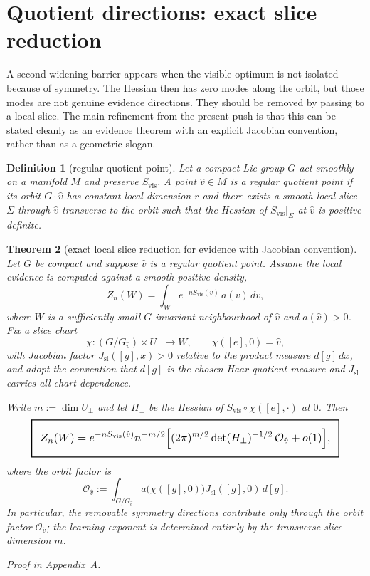 \documentclass[11pt,a4paper]{article}
\numberwithin{equation}{section}
\newcommand{\geomboxed}[1]{%
  \setlength{\fboxsep}{8pt}%
  \setlength{\fboxrule}{0.9pt}%
  \fbox{\scalebox{1.12}{$\displaystyle #1$}}%
}
\theoremstyle{thmcompact}
\newtheorem{theorem}{Theorem}[section]
\newtheorem{definition}[theorem]{Definition}
\theoremstyle{remark}
\newcommand{\proofappendix}{\par{\hfill\scriptsize\emph{Proof in Appendix~A.}}\par}
\begin{document}
\section{Quotient directions: exact slice reduction}

A second widening barrier appears when the visible optimum is not isolated because of symmetry. The Hessian then has zero modes along the orbit, but those modes are not genuine evidence directions. They should be removed by passing to a local slice. The main refinement from the present push is that this can be stated cleanly as an evidence theorem with an explicit Jacobian convention, rather than as a geometric slogan.

\begin{definition}[regular quotient point]
Let a compact Lie group $G$ act smoothly on a manifold $M$ and preserve $S_{\mathrm{vis}}$. A point $\hat v\in M$ is a \emph{regular quotient point} if its orbit $G\cdot \hat v$ has constant local dimension $r$ and there exists a smooth local slice $\Sigma$ through $\hat v$ transverse to the orbit such that the Hessian of $S_{\mathrm{vis}}|_{\Sigma}$ at $\hat v$ is positive definite.
\end{definition}

\begin{theorem}[exact local slice reduction for evidence with Jacobian convention]\label{thm:slice-reduction}
Let $G$ be compact and suppose $\hat v$ is a regular quotient point. Assume the local evidence is computed against a smooth positive density,
\[
Z_n(W)=\int_W e^{-nS_{\mathrm{vis}}(v)}\,a(v)\,dv,
\]
where $W$ is a sufficiently small $G$-invariant neighbourhood of $\hat v$ and $a(\hat v)>0$. Fix a slice chart
\[
\chi:(G/G_{\hat v})\times U_\perp \longrightarrow W,
\qquad \chi([e],0)=\hat v,
\]
with Jacobian factor $J_{\mathrm{sl}}([g],x)>0$ relative to the product measure $d[g]\,dx$, and adopt the convention that $d[g]$ is the chosen Haar quotient measure and $J_{\mathrm{sl}}$ carries all chart dependence.

Write $m:=\dim U_\perp$ and let $H_\perp$ be the Hessian of $S_{\mathrm{vis}}\circ \chi([e],\cdot)$ at $0$. Then
\[
\geomboxed{
Z_n(W)
=
 e^{-nS_{\mathrm{vis}}(\hat v)}
 n^{-m/2}
\Bigl[
(2\pi)^{m/2}\det(H_\perp)^{-1/2}\,\mathcal O_{\hat v}
+o(1)
\Bigr],}
\]
where the orbit factor is
\[
\mathcal O_{\hat v}
:=
\int_{G/G_{\hat v}} a\bigl(\chi([g],0)\bigr)
J_{\mathrm{sl}}([g],0)\,d[g].
\]
In particular, the removable symmetry directions contribute only through the orbit factor $\mathcal O_{\hat v}$; the learning exponent is determined entirely by the transverse slice dimension $m$.
\proofappendix
\end{theorem}
\end{document}
